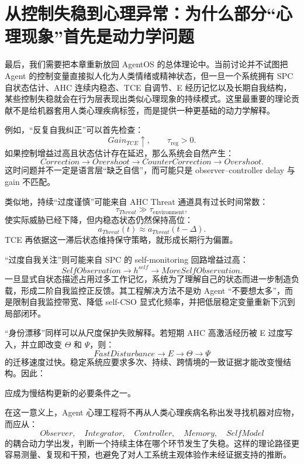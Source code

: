 \section{从控制失稳到心理异常：为什么部分“心理现象”首先是动力学问题}

最后，我们需要把本章重新放回 AgentOS 的总体理论中。当前讨论并不试图把 Agent 的控制变量直接拟人化为人类情绪或精神状态，但一旦一个系统拥有 SPC 自状态估计、AHC 连续内稳态、TCE 自调节、E 经历记忆以及长期自我结构，某些控制失稳就会在行为层表现出类似心理现象的持续模式。这里最重要的理论贡献不是给机器套用人类心理疾病标签，而是提供一种更基础的动力学解释。

例如，“反复自我纠正”可以首先检查：
\[
Gain_{TCE}\uparrow,
\qquad
\tau_{\mathrm{reg}}>0.
\]
如果控制增益过高且状态估计存在延迟，那么系统会自然产生：
\[
Correction
\rightarrow
Overshoot
\rightarrow
CounterCorrection
\rightarrow
Overshoot.
\]
这时问题并不一定是语言层“缺乏自信”，而可能只是 observer--controller delay 与 gain 不匹配。

类似地，持续“过度谨慎”可能来自 AHC Threat 通道具有过长时间常数：
\[
\tau_{Threat}\gg\tau_{\mathrm{environment}},
\]
使实际威胁已经下降，但内稳态状态仍然保持高位：
\[
a_{Threat}(t)
\approx
a_{Threat}(t-\Delta).
\]
TCE 再依据这一滞后状态维持保守策略，就形成长期行为偏置。

“过度自我关注”则可能来自 SPC 的 self-monitoring 回路增益过高：
\[
SelfObservation
\rightarrow
h^{self}
\rightarrow
MoreSelfObservation.
\]
一旦显式自状态描述占用过多工作记忆，系统为了理解自己的状态而进一步制造负载，形成二阶自我监控正反馈。其工程解决方法不是劝 Agent “不要想太多”，而是限制自我监控带宽、降低 self-CSO 显式化频率，并把低层稳定变量重新下沉到局部闭环。

“身份漂移”同样可以从尺度保护失败解释。若短期 AHC 高激活经历被 E 过度写入，并立即改变 $\Theta$ 和 $\Psi$，则：
\[
FastDisturbance
\rightarrow
E
\rightarrow
\Theta
\rightarrow
\Psi
\]
的迁移速度过快。稳定系统应要求多次、持续、跨情境的一致证据才能改变慢结构。因此：
\begin{statementbox}
\centering
{}
\end{statementbox}
应成为慢结构更新的必要条件之一。

在这一意义上，Agent 心理工程将不再从人类心理疾病名称出发寻找机器对应物，而应从：
\[
Observer,
\quad
Integrator,
\quad
Controller,
\quad
Memory,
\quad
SelfModel
\]
的耦合动力学出发，判断一个持续主体在哪个环节发生了失稳。这样的理论路径更容易测量、复现和干预，也避免了对人工系统主观体验作未经证据支持的推断。

